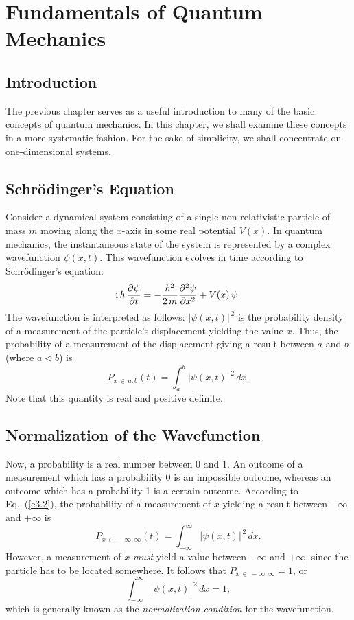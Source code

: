 \chapter{Fundamentals of Quantum Mechanics}\label{s4}
\section{Introduction}
The previous chapter serves as a useful introduction to many of the basic
concepts of quantum mechanics. In this chapter, we shall examine
these concepts in a more systematic 
fashion. For the sake of simplicity, we shall  concentrate on one-dimensional systems.

\section{Schr\"{o}dinger's Equation}
Consider a dynamical system consisting of a single non-relativistic particle of mass $m$ moving along the $x$-axis in some real potential $V(x)$. In quantum mechanics, the instantaneous state of the system is represented by a complex wavefunction $\psi(x,t)$. This wavefunction evolves in time
according to Schr\"{o}dinger's equation:
\begin{equation}\label{e3.1}
{\rm i}\,\hbar\,\frac{\partial\psi}{\partial t} = -\frac{\hbar^2}{2\,m}\frac{\partial^2 \psi}{\partial x^2} + V(x)\,\psi.
\end{equation}
The wavefunction is interpreted as follows: $|\psi(x,t)|^{\,2}$ is
the probability density of a measurement of the particle's
displacement yielding the value $x$. Thus, the probability of
a measurement of the displacement giving a result
between $a$ and $b$ (where $a<b$) is
\begin{equation}\label{e3.2}
P_{x\,\in\, a:b}(t) = \int_{a}^{b}|\psi(x,t)|^{\,2}\,dx.
\end{equation}
Note that this quantity is real and positive definite.

\section{Normalization of the Wavefunction}
Now, a probability is a real number between 0 and 1. An outcome
of a measurement which has a probability 0 is an impossible outcome, whereas an
outcome which has a probability 1 is a certain outcome. According to
Eq.~(\ref{e3.2}), the probability of a measurement of $x$ yielding
a result between $-\infty$ and $+\infty$ is
\begin{equation}
P_{x\,\in\, -\infty:\infty}(t) = \int_{-\infty}^{\infty}|\psi(x,t)|^{\,2}\,dx.
\end{equation}
However, a measurement of $x$ {\em must}\/ yield a value between $-\infty$ and
$+\infty$, since the particle has to be located somewhere. It follows that
$P_{x\,\in\, -\infty:\infty}=1$, or
\begin{equation}\label{e3.4}
\int_{-\infty}^{\infty}|\psi(x,t)|^{\,2}\,dx = 1,
\end{equation}
which is generally known as the {\em normalization condition}\/ for the
wavefunction.

